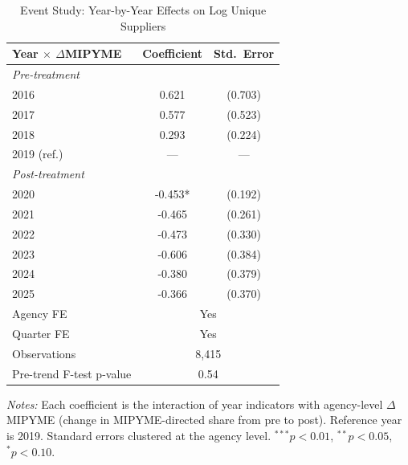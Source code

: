 \begin{table}[t]
\centering
\caption{Event Study: Year-by-Year Effects on Log Unique Suppliers}
\label{tab:event}
\begin{tabular}{lcc}
\hline\hline
Year $\times$ $\Delta$MIPYME & Coefficient & Std.~Error \\
\hline
\multicolumn{3}{l}{\textit{Pre-treatment}} \\
2016 & 0.621 & (0.703) \\
2017 & 0.577 & (0.523) \\
2018 & 0.293 & (0.224) \\
2019 (ref.) & --- & --- \\
\hline
\multicolumn{3}{l}{\textit{Post-treatment}} \\
2020 & -0.453* & (0.192) \\
2021 & -0.465 & (0.261) \\
2022 & -0.473 & (0.330) \\
2023 & -0.606 & (0.384) \\
2024 & -0.380 & (0.379) \\
2025 & -0.366 & (0.370) \\
\hline
Agency FE & \multicolumn{2}{c}{Yes} \\
Quarter FE & \multicolumn{2}{c}{Yes} \\
Observations & \multicolumn{2}{c}{8,415} \\
Pre-trend F-test p-value & \multicolumn{2}{c}{0.54} \\
\hline\hline
\end{tabular}
\begin{tablenotes}
\item \textit{Notes:} Each coefficient is the interaction of year indicators with agency-level $\Delta$MIPYME (change in MIPYME-directed share from pre to post). Reference year is 2019. Standard errors clustered at the agency level. $^{***}p<0.01$, $^{**}p<0.05$, $^{*}p<0.10$.
\end{tablenotes}
\end{table}


